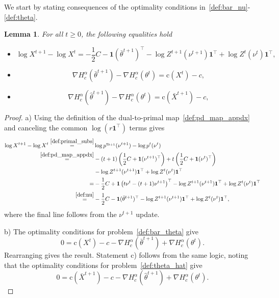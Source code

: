 \documentclass[10pt]{article}
\theoremstyle{plain}
\newtheorem{lemma}[theorem]{Lemma}
\theoremstyle{definition}
\theoremstyle{remark}
\newcommand{\one}{\mathbf{1}}
\newcommand{\col}{\bm{\mathrm{c}}}
\begin{document}
We start by stating consequences of the optimality conditions in~\eqref{def:bar_nu}-\eqref{def:theta}.
\begin{lemma}\label{lem:logterms}
    For all $t\geq 0$, the following equalities hold
    \begin{itemize}
        \item[a)]
        \begin{equation}\label{eq:logterm_primal}
            \log X^{t+1}-\log X^{t}=-\frac{1}{2}C-\one(\bar\theta^{t+1})^\top-\log Z^{t+1}(\nu^{t+1})\one^\top+\log Z^{t}(\nu^{t})\one^\top,
        \end{equation}
        \item[b)]
        \begin{equation}\label{eq:opt_dual_mid}
            \nabla H_c^\alpha(\bar \theta^{t+1})-\nabla H_c^\alpha( \theta^t)=\col(X^{t})-c,
        \end{equation}
        \item[c)]
        \begin{equation}\label{eq:opt_dual_hat}
            \nabla H_c^\alpha(\hat \theta^{t+1})-\nabla H_c^\alpha( \theta^t)=\col(\bar X^{t+1})-c,
        \end{equation}
    \end{itemize}
\end{lemma}
\begin{proof}
    a) Using the definition of the dual-to-primal map~\eqref{def:pd_map_appdx} and canceling the common $\log (r\one^\top)$ terms gives 
    \begin{align*}
      \log X^{t+1}-\log X^{t}\stackrel{\eqref{def:primal_subs}}=& \log p^{\eta_{t+1}}(\nu^{t+1})-\log p^{t}(\nu^{t})\\
      \stackrel{\eqref{def:pd_map_appdx}}=&-(t+1)\left(\frac{1}{2}C+\one(\nu^{t+1})^\top\right)+t\left(\frac{1}{2}C+\one(\nu^{t})^\top\right)\\&-\log Z^{t+1}(\nu^{t+1})\one^\top+\log Z^{t}(\nu^{t})\one^\top\\
      =&-\frac{1}{2}C+\one\left(t\nu^t-(t+1)\nu^{t+1}\right)^\top-\log Z^{t+1}(\nu^{t+1})\one^\top+\log Z^{t}(\nu^{t})\one^\top\\
      \stackrel{\eqref{def:nu}}=&-\frac{1}{2}C-\one(\bar\theta^{t+1})^\top-\log Z^{t+1}(\nu^{t+1})\one^\top+\log Z^{t}(\nu^{t})\one^\top,
    \end{align*}
    where the final line follows from the $\nu^{t+1}$ update.

    b) The optimality conditions for problem~\eqref{def:bar_theta} give 
    \begin{equation}
    0=\col(X^t)-c -\nabla H_c^\alpha(\bar\theta^{t+1})+\nabla H_c^\alpha(\theta^t).
    \end{equation}
    Rearranging gives the result. Statement c) follows from the same logic, noting that the optimality conditions for problem~\eqref{def:theta_hat} give
    \begin{equation}
        0=\col(\bar X^{t+1})-c -\nabla H_c^\alpha(\hat\theta^{t+1})+\nabla H_c^\alpha(\theta^t).
    \end{equation}
\end{proof}
\end{document}
